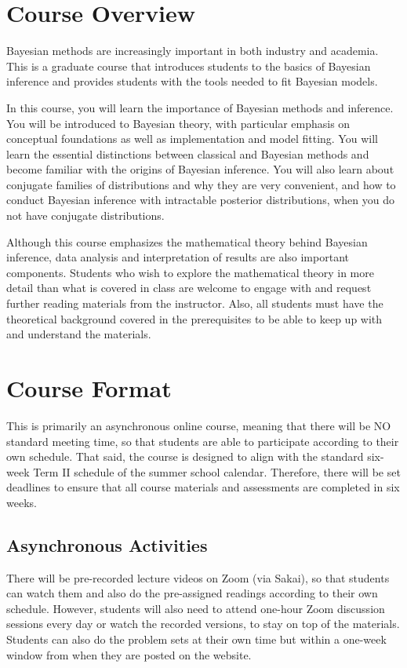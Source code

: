 \documentclass[11pt, a4paper]{article}
\begin{document}
\section{Course Overview}
Bayesian methods are increasingly important in both industry and academia. This is a graduate course that introduces students to the basics of Bayesian inference and provides students with the tools needed to fit Bayesian models.

In this course, you will learn the importance of Bayesian methods and inference. You will be introduced to Bayesian theory, with particular emphasis on conceptual foundations as well as implementation and model fitting. You will learn the essential distinctions between classical and Bayesian methods and become familiar with the origins of Bayesian inference. You will also learn about conjugate families of distributions and why they are very convenient, and how to conduct Bayesian inference with intractable posterior distributions,  when you do not have conjugate distributions.

Although this course emphasizes the mathematical theory behind Bayesian inference, data analysis and interpretation of results are also important components. Students who wish to explore the mathematical theory in more detail than what is covered in class are welcome to engage with and request further reading materials from the instructor. Also, all students must have the theoretical background covered in the prerequisites to be able to keep up with and understand the materials. 


\section{Course Format}
This is primarily an asynchronous online course, meaning that there will be NO standard meeting time, so that students are able to participate according to their own schedule. That said, the course is designed to align with the standard six-week Term II schedule of the summer school calendar. Therefore, there will be set deadlines to ensure that all course materials and assessments are completed in six weeks.

\subsection{Asynchronous Activities}
There will be pre-recorded lecture videos on Zoom (via Sakai), so that students can watch them and also do the pre-assigned readings according to their own schedule.  However, students will also need to attend one-hour Zoom discussion sessions every day or watch the recorded versions, to stay on top of the materials.  Students can also do the problem sets at their own time but within a one-week window from when they are posted on the website.
\end{document}
